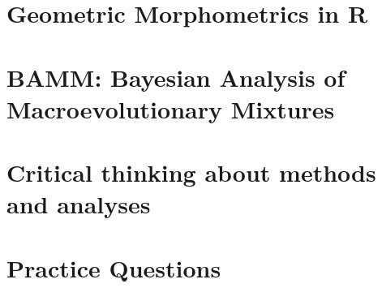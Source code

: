 \documentclass[]{book}
\begin{document}
\chapter{Geometric Morphometrics in
R}\label{geometric-morphometrics-in-r}

\chapter{BAMM: Bayesian Analysis of Macroevolutionary
Mixtures}\label{bamm-bayesian-analysis-of-macroevolutionary-mixtures}

\chapter{Critical thinking about methods and
analyses}\label{critical-thinking-about-methods-and-analyses}

\chapter{Practice Questions}\label{practice-questions}
\end{document}
